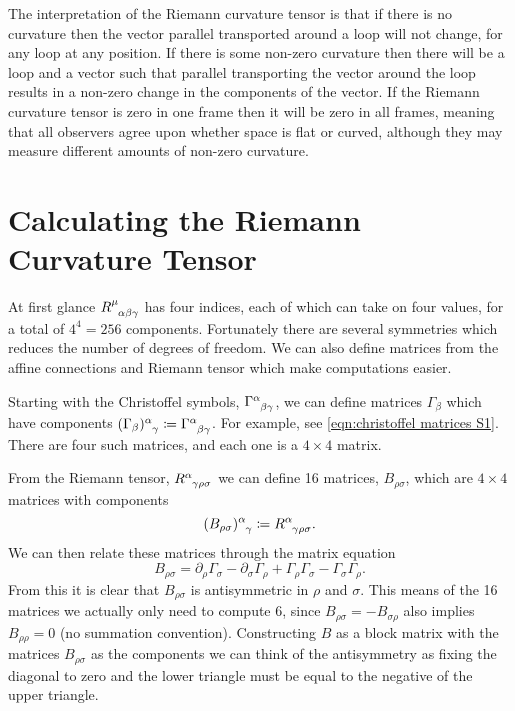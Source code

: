 \documentclass[fleqn]{NotesClass}
\newcommand*{\christoffel}[3]{\tensor{\Gamma}{^{#1}_{{#2}{#3}}}}
\begin{document}
    The interpretation of the Riemann curvature tensor is that if there is no curvature then the vector parallel transported around a loop will not change, for any loop at any position.
    If there is some non-zero curvature then there will be a loop and a vector such that parallel transporting the vector around the loop results in a non-zero change in the components of the vector.
    If the Riemann curvature tensor is zero in one frame then it will be zero in all frames, meaning that all observers agree upon whether space is flat or curved, although they may measure different amounts of non-zero curvature.
    
    \section{Calculating the Riemann Curvature Tensor}
    At first glance \(\tensor{R}{^\mu_{\alpha\beta\gamma}}\) has four indices, each of which can take on four values, for a total of \(4^4 = 256\) components.
    Fortunately there are several symmetries which reduces the number of degrees of freedom.
    We can also define matrices from the affine connections and Riemann tensor which make computations easier.
    
    Starting with the Christoffel symbols, \(\christoffel{\alpha}{\beta}{\gamma}\), we can define matrices \(\Gamma_\beta\) which have components \(\tensor{(\Gamma_\beta)}{^\alpha_\gamma} \coloneqq \christoffel{\alpha}{\beta}{\gamma}\).
    For example, see \cref{eqn:christoffel matrices S1}.
    There are four such matrices, and each one is a \(4 \times 4\) matrix.
    
    From the Riemann tensor, \(\tensor{R}{^\alpha_{\gamma\rho\sigma}}\) we can define 16 matrices, \(B_{\rho\sigma}\), which are \(4\times 4\) matrices with components
    \begin{equation}
        \tensor{(B_{\rho\sigma})}{^\alpha_\gamma} \coloneqq \tensor{R}{^\alpha_{\gamma\rho\sigma}}.
    \end{equation}
    We can then relate these matrices through the matrix equation
    \begin{equation}
        B_{\rho\sigma} = \partial_\rho \Gamma_\sigma - \partial_\sigma \Gamma_\rho + \Gamma_\rho \Gamma_\sigma - \Gamma_\sigma \Gamma_\rho.
    \end{equation}
    From this it is clear that \(B_{\rho\sigma}\) is antisymmetric in \(\rho\) and \(\sigma\).
    This means of the 16 matrices we actually only need to compute 6, since \(B_{\rho\sigma} = -B_{\sigma\rho}\) also implies \(B_{\rho\rho} = 0\) (no summation convention).
    Constructing \(B\) as a block matrix with the matrices \(B_{\rho\sigma}\) as the components we can think of the antisymmetry as fixing the diagonal to zero and the lower triangle must be equal to the negative of the upper triangle.
    
\end{document}
